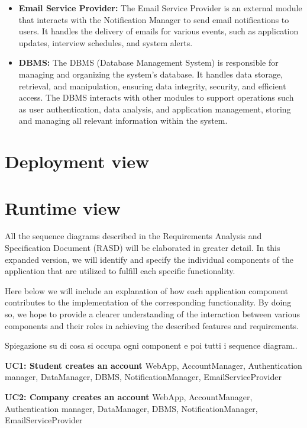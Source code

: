 \begin{itemize}
    \item \textbf{Email Service Provider:} The Email Service Provider is an external module that interacts with the Notification Manager to send email notifications to users. It handles the delivery of emails for various events, such as application updates, interview schedules, and system alerts.
    \item \textbf{DBMS:} The DBMS (Database Management System) is responsible for managing and organizing the system's database. It handles data storage, retrieval, and manipulation, ensuring data integrity, security, and efficient access. The DBMS interacts with other modules to support operations such as user authentication, data analysis, and application management, storing and managing all relevant information within the system.
    
\end{itemize}

\section{Deployment view}

\section{Runtime view}

All the sequence diagrams described in the Requirements Analysis and Specification Document (RASD) will be elaborated in greater detail. In this expanded version, we will identify and specify the individual components of the application that are utilized to fulfill each specific functionality. 

Here below we will include an explanation of how each application component contributes to the implementation of the corresponding functionality. By doing so, we hope to provide a clearer understanding of the interaction between various components and their roles in achieving the described features and requirements.

Spiegazione su di cosa si occupa ogni component e poi tutti i sequence diagram..

\textbf{UC1: Student creates an account}
WebApp, AccountManager, Authentication manager, DataManager, DBMS, NotificationManager, EmailServiceProvider

\textbf{UC2: Company creates an account}
WebApp, AccountManager, Authentication manager, DataManager, DBMS, NotificationManager, EmailServiceProvider

